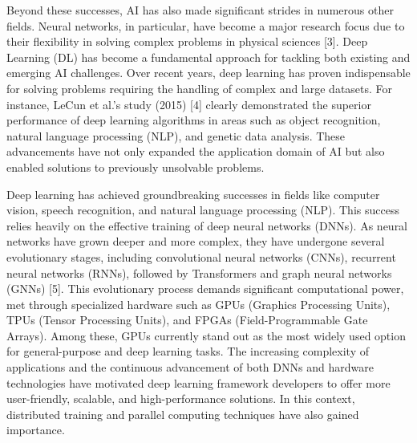 \documentclass[conference]{IEEEtran}
\begin{document}
Beyond these successes, AI has also made significant strides in numerous other fields. Neural networks, in particular, have become a major research focus due to their flexibility in solving complex problems in physical sciences [3]. Deep Learning (DL) has become a fundamental approach for tackling both existing and emerging AI challenges. Over recent years, deep learning has proven indispensable for solving problems requiring the handling of complex and large datasets. For instance, LeCun et al.'s study (2015) [4] clearly demonstrated the superior performance of deep learning algorithms in areas such as object recognition, natural language processing (NLP), and genetic data analysis. These advancements have not only expanded the application domain of AI but also enabled solutions to previously unsolvable problems.

Deep learning has achieved groundbreaking successes in fields like computer vision, speech recognition, and natural language processing (NLP). This success relies heavily on the effective training of deep neural networks (DNNs). As neural networks have grown deeper and more complex, they have undergone several evolutionary stages, including convolutional neural networks (CNNs), recurrent neural networks (RNNs), followed by Transformers and graph neural networks (GNNs) [5]. This evolutionary process demands significant computational power, met through specialized hardware such as GPUs (Graphics Processing Units), TPUs (Tensor Processing Units), and FPGAs (Field-Programmable Gate Arrays). Among these, GPUs currently stand out as the most widely used option for general-purpose and deep learning tasks. The increasing complexity of applications and the continuous advancement of both DNNs and hardware technologies have motivated deep learning framework developers to offer more user-friendly, scalable, and high-performance solutions. In this context, distributed training and parallel computing techniques have also gained importance.
\end{document}
